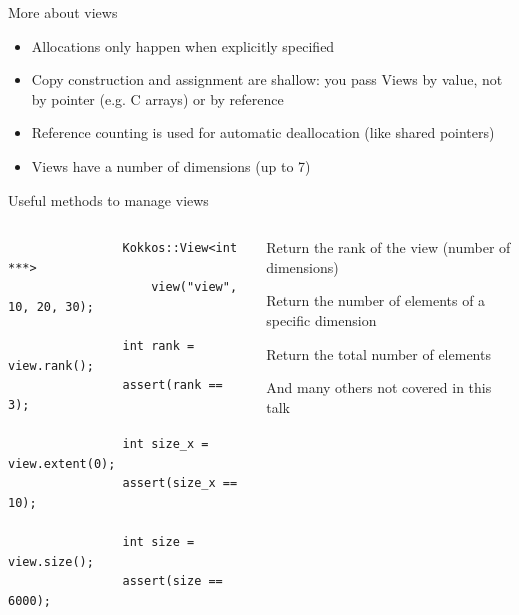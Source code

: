 \documentclass[aspectratio=169]{beamer}
\begin{document}

\begin{frame}{More about views}
    \begin{itemize}
        \item Allocations only happen when explicitly specified
        \item Copy construction and assignment are shallow: you pass Views by value, not by pointer (e.g. C arrays) or by reference
        \item Reference counting is used for automatic deallocation (like shared pointers)
        \item Views have a  number of dimensions (up to 7)
    \end{itemize}
\end{frame}


\begin{frame}[fragile]{Useful methods to manage views}
    \begin{columns}
        \begin{column}{0.45\linewidth}
            \begin{verbatim}
                Kokkos::View<int ***>
                    view("view", 10, 20, 30);

                int rank = view.rank();
                assert(rank == 3);

                int size_x = view.extent(0);
                assert(size_x == 10);

                int size = view.size();
                assert(size == 6000);
            \end{verbatim}
        \end{column}
        \begin{column}{0.55\linewidth}
            \begin{description}
                \item[\texttt{rank()}] Return the rank of the view (number of dimensions)
                \item[\texttt{extent(dim)}] Return the number of elements of a specific dimension
                \item[\texttt{size()}] Return the total number of elements
            \end{description}

            \vspace{0.5em}

            And many others not covered in this talk
        \end{column}
    \end{columns}
\end{frame}
\end{document}
